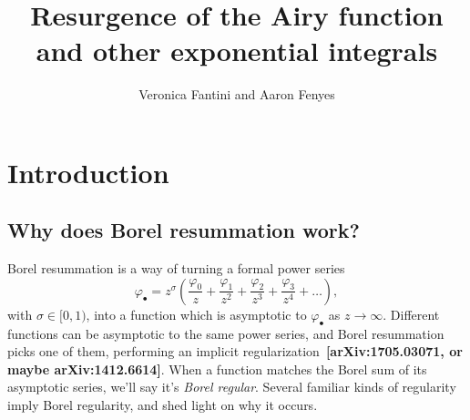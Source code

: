 \documentclass{article}
\title{Resurgence of the Airy function \\ and other exponential integrals}
\author{Veronica Fantini and Aaron Fenyes}
\newcommand{\series}[1]{#1_\bullet}
\begin{document}
\maketitle
\section{Introduction}
\subsection{Why does Borel resummation work?}
Borel resummation is a way of turning a formal power series
\[ \series{\varphi} = z^\sigma \left( \frac{\varphi_0}{z} + \frac{\varphi_1}{z^2} + \frac{\varphi_2}{z^3} + \frac{\varphi_3}{z^4} + \ldots \right), \]
with $\sigma \in [0, 1)$, into a function which is asymptotic to $\series{\varphi}$ as $z \to \infty$. Different functions can be asymptotic to the same power series, and Borel resummation picks one of them, performing an implicit regularization~\textbf{[arXiv:1705.03071, or maybe arXiv:1412.6614]}. When a function matches the Borel sum of its asymptotic series, we'll say it's {\em Borel regular}. Several familiar kinds of regularity imply Borel regularity, and shed light on why it occurs.
\end{document}
